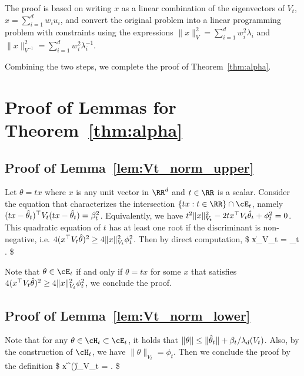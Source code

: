 The proof is based on writing $x$  as a linear combination of the eigenvectors of $V_t$, $x =\sum_{i=1}^d w_i u_i$, and convert the original problem into a linear programming problem with constraints using the expressions $\|x\|_V^2 = \sum_{i=1}^d w_i^2 \lambda_i$ and $
	\|x\|_{V^{-1}}^2 = \sum_{i=1}^d w_i^2 \lambda_i^{-1}$.

Combining the two steps, we complete the proof of Theorem~\ref{thm:alpha}.





\section{Proof of Lemmas for Theorem~\ref{thm:alpha}}
\label{sec:proof_alpha}
\subsection{Proof of Lemma~\ref{lem:Vt_norm_upper}}


	Let $\theta = t x $ where $x$ is any unit vector in $\RR^d$ and $t\in \RR $ is a scalar. Consider the equation that characterizes the intersection  $\{t x : t\in\RR \}\cap \cE_t $, namely
	$
	(t x - \hat{\theta}_t)^\top V_t (t x - \hat{\theta}_t) = \beta_t^2
	$.
	Equivalently, we have
	$
	t^2\|x\|_{V_t}^2 - 2 t  x^\top V_t \hat{\theta}_t + \phi_t^2 = 0
	$. This quadratic equation of $t$ has at least one root if the discriminant is non-negative, i.e.
	$
	4(x^\top V_t \hat{\theta})^2 \geq 4 \|x\|_{V_t}^2 \phi_t^2 
	$.
	Then by direct computation,
	\$
	\|x\|_{V_t} \leq {} \leq {} =   {\phi_t	}.
	\$

	Note that $\theta \in \cE_t$ if and only if $\theta = t x $ for some $x$ that satisfies $4(x^\top V_t \hat{\theta})^2 \geq 4 \|x\|_{V_t}^2 \phi_t^2$, we conclude the proof.
\Halmos 
\endproof
\subsection{Proof of Lemma~\ref{lem:Vt_norm_lower}}
	Note that for any $\theta \in \cH_t \subset\cE_t$, it holds that  $\|\theta\| \leq \|\hat{\theta}_t\| +  \beta_t/\lambda_d(V_t)  $. Also, by the construction of $\cH_t$, we have $\|\theta\|_{V_t}  =  \phi_t$. Then we conclude the proof by the definition
	\$
	\|x^\star(\theta )\|_{V_t} =  \geq {} .
	\$
\Halmos 
\endproof


